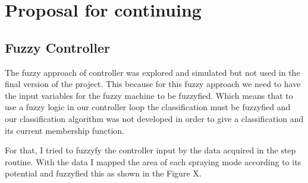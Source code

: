 \section{Proposal for continuing}

\subsection{Fuzzy Controller}

        The fuzzy approach of controller was explored and simulated but not used in the final version of the project.
        This because for this fuzzy approach we need to have the input variables for the fuzzy machine to be fuzzyfied.
        Which means that to use a fuzzy logic in our controller loop the classification must be fuzzyfied and our classification algorithm was not developed in order to give a classification and its current membership function.

        For that, I tried to fuzzyfy the controller input by the data acquired in the step routine. With the data I mapped the area of each spraying mode according to its potential and fuzzyfied this as shown in the Figure X.

